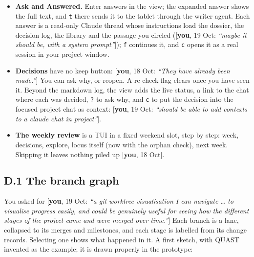 \documentclass[10pt]{extarticle}
\newcommand{\you}[2]{{\small[\textbf{you}, #1: \textit{``#2''}]}}
\newcommand{\youx}[1]{{\small[\textbf{you}, #1]}}
\newcommand{\Sub}[1]{\subsection*{#1}}
\begin{document}
\begin{itemize}
\item \textbf{Ask and Answered.} Enter answers in the view; the expanded answer shows the full text, and \texttt{t} there sends it to the tablet through the writer agent. Each answer is a read-only Claude thread whose instructions load the dossier, the decision log, the library and the passage you circled (\you{19 Oct}{maybe it should be, with a system prompt}); \texttt{f} continues it, and \texttt{c} opens it as a real session in your project window.
\item \textbf{Decisions} have no keep button: \you{18 Oct}{They have already been made.} You can ask why, or reopen. A re-check flag clears once you have seen it. Beyond the markdown log, the view adds the live status, a link to the chat where each was decided, \texttt{?} to ask why, and \texttt{c} to put the decision into the focused project chat as context: \you{19 Oct}{should be able to add contexts to a claude chat in project}.
\item \textbf{The weekly review} is a TUI in a fixed weekend slot, step by step: week, decisions, explore, locus itself (now with the orphan check), next week. Skipping it leaves nothing piled up \youx{18 Oct}.
\end{itemize}

\Sub{D.1 The branch graph}
You asked for \you{19 Oct}{a git worktree visualisation I can navigate \ldots{} to visualise progress easily, and could be genuinely useful for seeing how the different stages of the project came and were merged over time.} Each branch is a lane, collapsed to its merges and milestones, and each stage is labelled from its change records. Selecting one shows what happened in it. A first sketch, with QUAST invented as the example; it is drawn properly in the prototype:

\begin{center}
\end{center}
\end{document}
